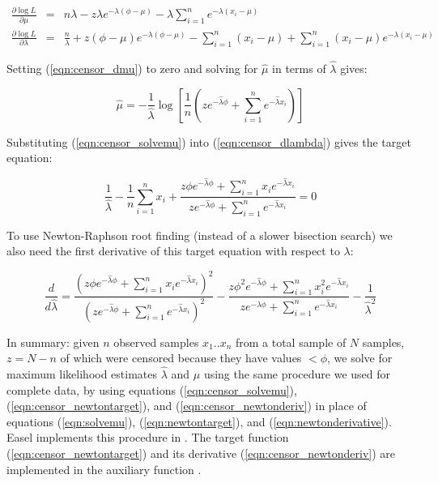 \begin{eqnarray}
\frac{\partial \log L}{\partial \mu} & = &
n \lambda  
- z \lambda e^{-\lambda (\phi - \mu)}
- \lambda \sum_{i=1}^{n} e^{-\lambda (x_i - \mu)}
\label{eqn:censor_dmu}
\\%
\frac{\partial \log L}{\partial \lambda} & = &
\frac{n}{\lambda} 
+ z (\phi - \mu) e^{-\lambda (\phi - \mu)}
- \sum_{i=1}^{n} (x_i - \mu) 
+ \sum_{i=1}^{n} (x_i - \mu) e^{-\lambda (x_i - \mu)}
\label{eqn:censor_dlambda}
\end{eqnarray}

Setting (\ref{eqn:censor_dmu}) to zero and solving for $\hat{\mu}$ in
terms of $\hat{\lambda}$ gives:

\begin{equation}
\hat{\mu}  =  - \frac{1}{\hat{\lambda}} 
	\log \left[ \frac{1}{n} 
	\left( z e^{-\hat{\lambda} \phi} 
               + \sum_{i=1}^{n} e^{-\hat{\lambda} x_i} \right)
	\right]
\label{eqn:censor_solvemu}
\end{equation}

Substituting (\ref{eqn:censor_solvemu}) into
(\ref{eqn:censor_dlambda}) gives the target equation:

\begin{equation}
\frac{1}{\hat{\lambda}} 
- \frac{1}{n} \sum_{i=1}^{n} x_i +
\frac{z \phi e^{-\hat{\lambda} \phi} + \sum_{i=1}^{n} x_i e^{-\hat{\lambda} x_i}} 
     {z e^{-\hat{\lambda} \phi} + \sum_{i=1}^{n} e^{-\hat{\lambda} x_i}} 
 =  0
\label{eqn:censor_newtontarget}
\end{equation}

To use Newton-Raphson root finding (instead of a slower bisection
search) we also need the first derivative of this target equation with
respect to $\lambda$:

\begin{equation}
\frac{d}{d\hat{\lambda}} = 
\frac{\left( 
        z \phi e^{-\hat{\lambda} \phi}
        + \sum_{i=1}^{n} x_i e^{-\hat{\lambda} x_i} 
       \right)^2 } 
     {\left( 
        z e^{-\hat{\lambda} \phi}
        + \sum_{i=1}^{n} e^{-\hat{\lambda} x_i}     
       \right)^2 }
-
\frac{z \phi^2 e^{-\hat{\lambda} \phi} + \sum_{i=1}^{n} x_i^2 e^{-\hat{\lambda} x_i}}
     {z  e^{-\hat{\lambda} \phi} + \sum_{i=1}^{n} e^{-\hat{\lambda} x_i}}
-
\frac{1}{\hat{\lambda}^2}
\label{eqn:censor_newtonderiv}
\end{equation}

In summary: given $n$ observed samples $x_1..x_n$ from a total sample
of $N$ samples, $z = N-n$ of which were censored because they have
values $< \phi$, we solve for maximum likelihood estimates
$\hat{\lambda}$ and $\hat{\mu}$ using the same procedure we used for
complete data, by using equations (\ref{eqn:censor_solvemu}),
(\ref{eqn:censor_newtontarget}), and (\ref{eqn:censor_newtonderiv}) in
place of equations (\ref{eqn:solvemu}), (\ref{eqn:newtontarget}), and
(\ref{eqn:newtonderivative}). Easel implements this procedure in
.  The target function
(\ref{eqn:censor_newtontarget}) and its derivative
(\ref{eqn:censor_newtonderiv}) are implemented in the auxiliary
function  \citep{Lawless82}.

